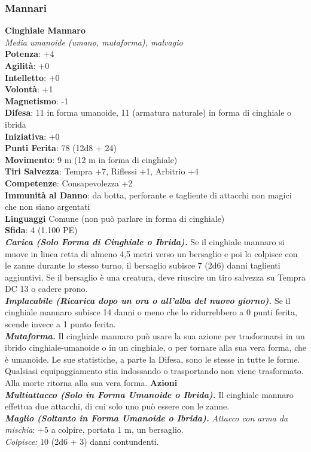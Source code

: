 \begin{multicols}{2}
\subsubsection{Mannari}

\medskip\textbf{Cinghiale Mannaro}\\
\emph{Media umanoide (umano, mutaforma), malvagio} \\
\textbf{Potenza}: +4\\
\textbf{Agilità}: +0\\
\textbf{Intelletto}: +0\\
\textbf{Volontà}: +1\\
\textbf{Magnetismo}: -1\\
\textbf{Difesa}: 11 in forma umanoide, 11 (armatura naturale) in forma di cinghiale o ibrida\\ \textbf{Iniziativa}: +0\\
\textbf{Punti Ferita}: 78 (12d8 + 24)\\
\textbf{Movimento}: 9 m (12 m in forma di cinghiale)\\
\textbf{Tiri Salvezza}: Tempra +7, Riflessi +1, Arbitrio +4\\
\textbf{Competenze}: Consapevolezza +2\\
\textbf{Immunità al Danno}: da botta, perforante e tagliente di attacchi non magici che non siano argentati\\
\textbf{Linguaggi} Comune (non può parlare in forma di cinghiale)\\
\textbf{Sfida}: 4 (1.100 PE)\smallskip\\
\emph{\textbf{Carica (Solo Forma di Cinghiale o Ibrida).}} Se il cinghiale mannaro si muove in linea retta di almeno 4,5 metri verso un bersaglio e poi lo colpisce con le zanne durante lo stesso turno, il bersaglio subisce 7 (2d6) danni taglienti aggiuntivi. Se il bersaglio è una creatura, deve riuscire un tiro salvezza su Tempra DC 13 o cadere prono.\\
\emph{\textbf{Implacabile (Ricarica dopo un ora o all'alba del nuovo giorno).}} Se il cinghiale mannaro subisce 14 danni o meno che lo ridurrebbero a 0 punti ferita, scende invece a 1 punto ferita.\\
\emph{\textbf{Mutaforma.}} Il cinghiale mannaro può usare la sua azione per trasformarsi in un ibrido cinghiale-umanoide o in un cinghiale, o per tornare alla sua vera forma, che è umanoide. Le sue statistiche, a parte la Difesa, sono le stesse in tutte le forme. Qualsiasi equipaggiamento stia indossando o trasportando non viene trasformato. Alla morte ritorna alla sua vera forma.
\smallskip\textbf{Azioni}\\
\emph{\textbf{Multiattacco (Solo in Forma Umanoide o Ibrida).}} Il cinghiale mannaro effettua due attacchi, di cui solo uno può essere con le zanne.\\
\emph{\textbf{Maglio (Soltanto in Forma Umanoide o Ibrida).} Attacco con arma da mischia}: +5 a colpire, portata 1 m, un bersaglio. \\
\emph{Colpisce:} 10 (2d6 + 3) danni contundenti.\\


\end{multicols}
